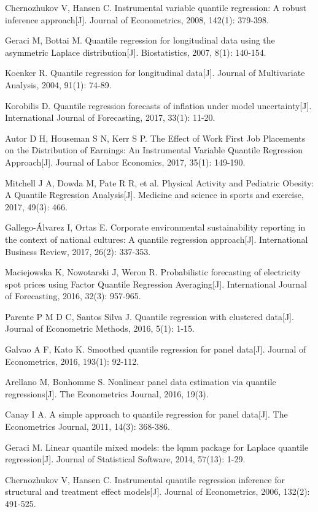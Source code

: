 \documentclass[11pt,a4paper,]{article}
\theoremstyle{definition}
\theoremstyle{definition}
\theoremstyle{remark}
\begin{document}
Chernozhukov V, Hansen C. Instrumental variable quantile regression: A
robust inference approach{[}J{]}. Journal of Econometrics, 2008, 142(1):
379-398.

Geraci M, Bottai M. Quantile regression for longitudinal data using the
asymmetric Laplace distribution{[}J{]}. Biostatistics, 2007, 8(1):
140-154.

Koenker R. Quantile regression for longitudinal data{[}J{]}. Journal of
Multivariate Analysis, 2004, 91(1): 74-89.

Korobilis D. Quantile regression forecasts of inflation under model
uncertainty{[}J{]}. International Journal of Forecasting, 2017, 33(1):
11-20.

Autor D H, Houseman S N, Kerr S P. The Effect of Work First Job
Placements on the Distribution of Earnings: An Instrumental Variable
Quantile Regression Approach{[}J{]}. Journal of Labor Economics, 2017,
35(1): 149-190.

Mitchell J A, Dowda M, Pate R R, et al. Physical Activity and Pediatric
Obesity: A Quantile Regression Analysis{[}J{]}. Medicine and science in
sports and exercise, 2017, 49(3): 466.

Gallego-Álvarez I, Ortas E. Corporate environmental sustainability
reporting in the context of national cultures: A quantile regression
approach{[}J{]}. International Business Review, 2017, 26(2): 337-353.

Maciejowska K, Nowotarski J, Weron R. Probabilistic forecasting of
electricity spot prices using Factor Quantile Regression
Averaging{[}J{]}. International Journal of Forecasting, 2016, 32(3):
957-965.

Parente P M D C, Santos Silva J. Quantile regression with clustered
data{[}J{]}. Journal of Econometric Methods, 2016, 5(1): 1-15.

Galvao A F, Kato K. Smoothed quantile regression for panel data{[}J{]}.
Journal of Econometrics, 2016, 193(1): 92-112.

Arellano M, Bonhomme S. Nonlinear panel data estimation via quantile
regressions{[}J{]}. The Econometrics Journal, 2016, 19(3).

Canay I A. A simple approach to quantile regression for panel
data{[}J{]}. The Econometrics Journal, 2011, 14(3): 368-386.

Geraci M. Linear quantile mixed models: the lqmm package for Laplace
quantile regression{[}J{]}. Journal of Statistical Software, 2014,
57(13): 1-29.

Chernozhukov V, Hansen C. Instrumental quantile regression inference for
structural and treatment effect models{[}J{]}. Journal of Econometrics,
2006, 132(2): 491-525.
\end{document}
